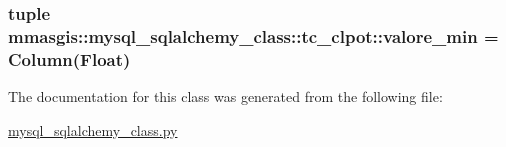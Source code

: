\hypertarget{classmmasgis_1_1mysql__sqlalchemy__class_1_1tc__clpot_ab00079f34a9d722244310a3ee938e5a6}{
\subsubsection[{valore\_\-min}]{\setlength{\rightskip}{0pt plus 5cm}tuple {\bf mmasgis::mysql\_\-sqlalchemy\_\-class::tc\_\-clpot::valore\_\-min} = Column(Float)}}
\label{classmmasgis_1_1mysql__sqlalchemy__class_1_1tc__clpot_ab00079f34a9d722244310a3ee938e5a6}


The documentation for this class was generated from the following file:\begin{DoxyCompactItemize}
\item 
\hyperlink{mysql__sqlalchemy__class_8py}{mysql\_\-sqlalchemy\_\-class.py}\end{DoxyCompactItemize}
